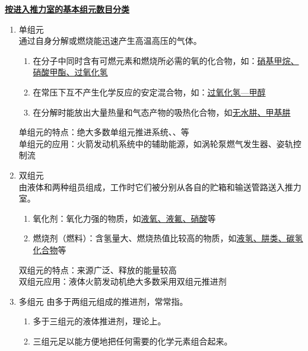 \noindent \textbf{\underline{按进入推力室的基本组元数目分类}}
\vspace*{-0.5em}
\begin{enumerate}[\hspace*{1.5em} (1)  ]
	\item 单组元\\
	通过自身分解或燃烧能迅速产生高温高压的气体。\vspace*{-0.8em}
	\begin{enumerate}
		\item 在分子中同时含有可燃元素和燃烧所必需的氧的化合物，如：\underline{硝基甲烷、硝酸甲酯、过氧化氢} \vspace*{-0.5em}
		\item 在常压下互不产生化学反应的安定混合物，如：\underline{过氧化氢—甲醇}\vspace*{-0.5em}
		\item 在分解时能放出大量热量和气态产物的吸热化合物，如\underline{无水肼、甲基肼}\vspace*{-0.5em}
	\end{enumerate}
	单组元的特点：绝大多数单组元推进系统\blue[结构简单]、\blue[使用方便]、\blue[性能比较低]等\\
	单组元的应用：火箭发动机系统中的辅助能源，如涡轮泵燃气发生器、姿轨控制流
	
	\item 双组元\\
	由液体\red[燃烧剂]和\red[氧化剂]两种组员组成，工作时它们被分别从各自的贮箱和输送管路送入推力室。\vspace*{-0.8em}
	\begin{enumerate}
		\item 氧化剂：氧化力强的物质，如\underline{液氧、液氟、硝酸}等\vspace*{-0.5em}
		\item 燃烧剂（燃料）：含氢量大、燃烧热值比较高的物质，如\underline{液氢、肼类、碳氢化合物}等\vspace*{-0.5em}
	\end{enumerate}
	双组元的特点：来源广泛、释放的能量较高\\
	双组元应用：液体火箭发动机绝大多数采用双组元推进剂
	
	\item 多组元
	由多于两组元组成的推进剂，常常指。\vspace*{-0.8em}
	\begin{enumerate}
		\item 多于三组元的液体推进剂，理论上\red[能量不会进一步的增加]。\vspace*{-0.5em}
		\item 三组元足以能方便地把任何需要的化学元素组合起来。\vspace*{-0.5em}
	\end{enumerate}
	

\end{enumerate}
